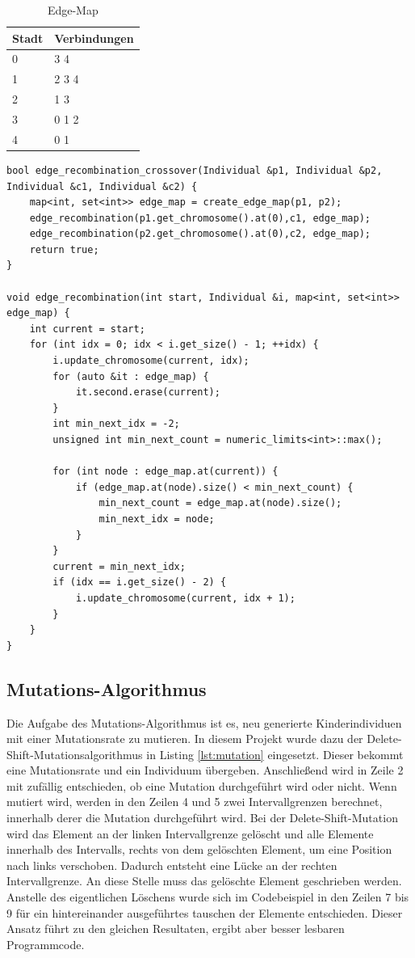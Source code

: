 \begin{table}[H]
\center
\caption{Edge-Map}
\begin{tabular}{l|l}
Stadt & Verbindungen \\
\hline
0 & 3 4\\
1 & 2 3 4\\
2 & 1 3\\
3 & 0 1 2\\
4 & 0 1\\
\end{tabular}
\label{tab:em}
\end{table}

\begin{minipage}{\linewidth}
\begin{lstlisting}[caption={Edge-Recombination-Crossover}, firstnumber=1, captionpos=b, label=lst:erx]
bool edge_recombination_crossover(Individual &p1, Individual &p2, Individual &c1, Individual &c2) {
	map<int, set<int>> edge_map = create_edge_map(p1, p2);
	edge_recombination(p1.get_chromosome().at(0),c1, edge_map);
	edge_recombination(p2.get_chromosome().at(0),c2, edge_map);
	return true;
}

void edge_recombination(int start, Individual &i, map<int, set<int>> edge_map) {
	int current = start;
	for (int idx = 0; idx < i.get_size() - 1; ++idx) {
		i.update_chromosome(current, idx);
		for (auto &it : edge_map) {
			it.second.erase(current);
		}
		int min_next_idx = -2;
		unsigned int min_next_count = numeric_limits<int>::max();

		for (int node : edge_map.at(current)) {
			if (edge_map.at(node).size() < min_next_count) {
				min_next_count = edge_map.at(node).size();
				min_next_idx = node;
			}
		}
		current = min_next_idx;
		if (idx == i.get_size() - 2) {
			i.update_chromosome(current, idx + 1);
		}
	}
}
\end{lstlisting}
\end{minipage}

\subsection{Mutations-Algorithmus}
Die Aufgabe des Mutations-Algorithmus ist es, neu generierte Kinderindividuen mit einer Mutationsrate zu mutieren.
In diesem Projekt wurde dazu der Delete-Shift-Mutationsalgorithmus \cite[S. 277]{schoeneburg} in Listing \ref{lst:mutation} eingesetzt. Dieser bekommt eine Mutationsrate und ein Individuum übergeben.
Anschließend wird in Zeile 2 mit zufällig entschieden, ob eine Mutation durchgeführt wird oder nicht. Wenn mutiert wird, werden in den Zeilen 4 und 5 zwei Intervallgrenzen berechnet, innerhalb derer die Mutation durchgeführt wird.
Bei der Delete-Shift-Mutation wird das Element an der linken Intervallgrenze gelöscht und alle Elemente innerhalb des Intervalls, rechts von dem gelöschten Element, um eine Position nach links verschoben. Dadurch entsteht eine Lücke an der rechten Intervallgrenze. An diese Stelle muss das gelöschte Element geschrieben werden. Anstelle des eigentlichen Löschens wurde sich im Codebeispiel in den Zeilen 7 bis 9 für ein hintereinander ausgeführtes tauschen der Elemente entschieden. Dieser Ansatz führt zu den gleichen Resultaten, ergibt aber besser lesbaren Programmcode.


